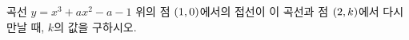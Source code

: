 곡선 $y=x^3+ax^2-a-1$ 위의 점 $(1{,}\mkern3mu\mathopen{}0)$에서의 접선이 이 곡선과 점 $(2{,}\mkern3mu\mathopen{}k)$에서 다시 만날 때, $k$의 값을 구하시오. 
